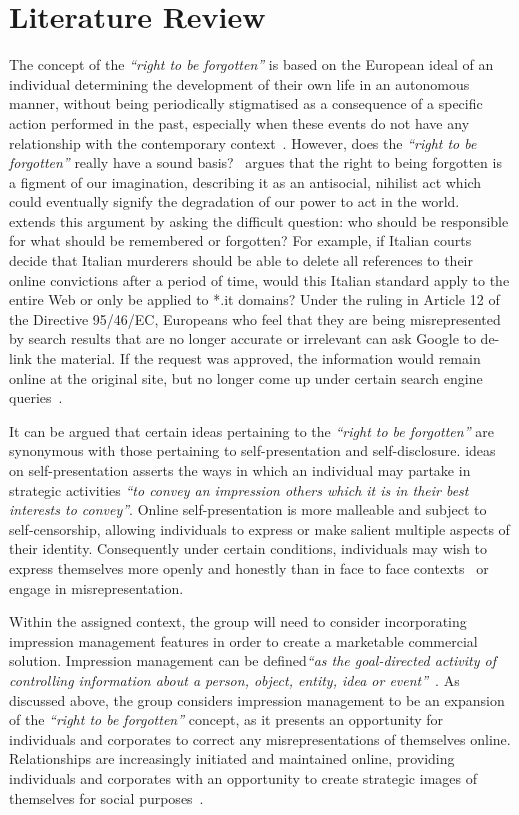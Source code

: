 \section{Literature Review}

The concept of the \emph{``right to be forgotten''} is based on the European ideal of an individual determining the development of their own life in an autonomous manner, without being periodically stigmatised as a consequence of a specific action performed in the past, especially when these events do not have any relationship with the contemporary context~\parencite{art:eu_forgotten}. However, does the \emph{``right to be forgotten''} really have a sound basis?~\textcite{web:no_right_forgotten} argues that the right to being forgotten is a figment of our imagination, describing it as an antisocial, nihilist act which could eventually signify the degradation of our power to act in the world.~\textcite{web:foggy_thinking} extends this argument by asking the difficult question: who should be responsible for what should be remembered or forgotten? For example, if Italian courts decide that Italian murderers should be able to delete all references to their online convictions after a period of time, would this Italian standard apply to the entire Web or only be applied to *.it domains? Under the ruling in Article 12 of the Directive 95/46/EC, Europeans who feel that they are being misrepresented by search results that are no longer accurate or irrelevant can ask Google to de-link the material. If the request was approved, the information would remain online at the original site, but no longer come up under certain search engine queries~\parencite{web:right_to_be_forgotten}. 

It can be argued that certain ideas pertaining to the \emph{``right to be forgotten''} are synonymous with those pertaining to self-presentation and self-disclosure. \textcite{book:self_presentation} ideas on self-presentation asserts the ways in which an individual may partake in strategic activities \emph{``to convey an impression others which it is in their best interests to convey''}. Online self-presentation is more malleable and subject to self-censorship, allowing individuals to express or make salient multiple aspects of their identity. Consequently under certain conditions, individuals may wish to express themselves more openly and honestly than in face to face contexts~\parencite{art:manage_impress} or engage in misrepresentation.

Within the assigned context, the group will need to consider incorporating impression management features in order to create a marketable commercial solution. Impression management can be defined\emph{``as the goal-directed activity of controlling information about a person, object, entity, idea or event''}~\parencite{art:appearing_competent}. As discussed above, the group considers impression management to be an expansion of the \emph{``right to be forgotten''} concept, as it presents an opportunity for individuals and corporates to correct any misrepresentations of themselves online. Relationships are increasingly initiated and maintained online, providing individuals and corporates with an opportunity to create strategic images of themselves for social purposes~\parencite{art:olm}.

